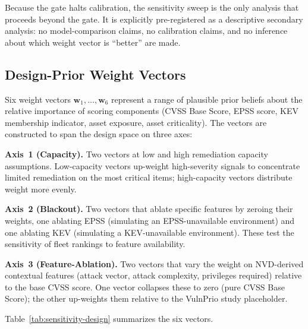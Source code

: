 \documentclass[conference]{IEEEtran}
\begin{document}
Because the gate halts calibration, the sensitivity sweep is the only
analysis that proceeds beyond the gate. It is explicitly pre-registered
as a descriptive secondary analysis: no model-comparison claims, no
calibration claims, and no inference about which weight vector is
``better'' are made.

\subsection{Design-Prior Weight Vectors}
\label{subsec:weight-vectors}

Six weight vectors $\mathbf{w}_1, \ldots, \mathbf{w}_6$ represent a range
of plausible prior beliefs about the relative importance of scoring
components (CVSS Base Score, EPSS score, KEV membership indicator, asset
exposure, asset criticality). The vectors are constructed to span the
design space on three axes:

\textbf{Axis~1 (Capacity).} Two vectors at low and high remediation
capacity assumptions. Low-capacity vectors up-weight high-severity signals
to concentrate limited remediation on the most critical items; high-capacity
vectors distribute weight more evenly.

\textbf{Axis~2 (Blackout).} Two vectors that ablate specific features by
zeroing their weights, one ablating EPSS (simulating an EPSS-unavailable
environment) and one ablating KEV (simulating a KEV-unavailable environment).
These test the sensitivity of fleet rankings to feature availability.

\textbf{Axis~3 (Feature-Ablation).} Two vectors that vary the weight on
NVD-derived contextual features (attack vector, attack complexity,
privileges required) relative to the base CVSS score. One vector collapses
these to zero (pure CVSS Base Score); the other up-weights them relative
to the VulnPrio study placeholder.

Table~\ref{tab:sensitivity-design} summarizes the six vectors.
\end{document}
